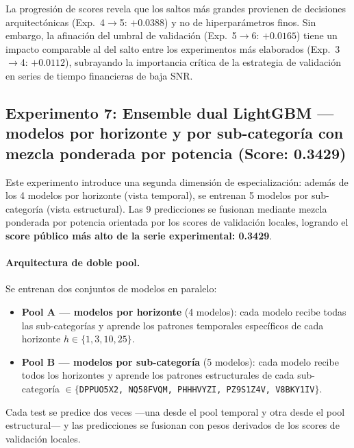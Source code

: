 \documentclass{article}
\begin{document}
La progresión de scores revela que los saltos más grandes provienen de decisiones arquitectónicas (Exp.~4$\to$5: $+0.0388$) y no de hiperparámetros finos. Sin embargo, la afinación del umbral de validación (Exp.~5$\to$6: $+0.0165$) tiene un impacto comparable al del salto entre los experimentos más elaborados (Exp.~3$\to$4: $+0.0112$), subrayando la importancia crítica de la estrategia de validación en series de tiempo financieras de baja SNR.

\subsection{Experimento 7: Ensemble dual LightGBM — modelos por horizonte y por sub-categoría con mezcla ponderada por potencia (Score: 0.3429)}

Este experimento introduce una segunda dimensión de especialización: además de los 4 modelos por horizonte (vista temporal), se entrenan 5 modelos por sub-categoría (vista estructural). Las 9 predicciones se fusionan mediante mezcla ponderada por potencia orientada por los scores de validación locales, logrando el \textbf{score público más alto de la serie experimental: 0.3429}.

\paragraph{Arquitectura de doble pool.}
Se entrenan dos conjuntos de modelos en paralelo:
\begin{itemize}
    \item \textbf{Pool A — modelos por horizonte} (4 modelos): cada modelo recibe todas las sub-categorías y aprende los patrones temporales específicos de cada horizonte $h \in \{1, 3, 10, 25\}$.
    \item \textbf{Pool B — modelos por sub-categoría} (5 modelos): cada modelo recibe todos los horizontes y aprende los patrones estructurales de cada sub-categoría $\in \{$\texttt{DPPUO5X2, NQ58FVQM, PHHHVYZI, PZ9S1Z4V, V8BKY1IV}$\}$.
\end{itemize}
Cada test se predice dos veces —una desde el pool temporal y otra desde el pool estructural— y las predicciones se fusionan con pesos derivados de los scores de validación locales.
\end{document}
